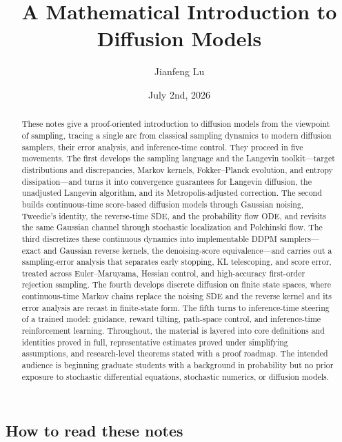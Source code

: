 \documentclass{amsart}
\title{A Mathematical Introduction to Diffusion Models}
\author{Jianfeng Lu}
\date{July 2nd, 2026}
\numberwithin{equation}{section}
\theoremstyle{plain}
\theoremstyle{definition}
\theoremstyle{remark}
\begin{document}
\begin{abstract}
These notes give a proof-oriented introduction to diffusion models from the
viewpoint of sampling, tracing a single arc from classical sampling dynamics to
modern diffusion samplers, their error analysis, and inference-time control.
They proceed in five movements.  The first develops the sampling language and
the Langevin toolkit---target distributions and discrepancies, Markov kernels,
Fokker--Planck evolution, and entropy dissipation---and turns it into
convergence guarantees for Langevin diffusion, the unadjusted Langevin
algorithm, and its Metropolis-adjusted correction.  The second builds
continuous-time score-based diffusion models through Gaussian noising, Tweedie's
identity, the reverse-time SDE, and the probability flow ODE, and revisits the
same Gaussian channel through stochastic localization and Polchinski flow.  The
third discretizes these continuous dynamics into implementable DDPM samplers---
exact and Gaussian reverse kernels, the denoising-score equivalence---and
carries out a sampling-error analysis that separates early stopping, KL
telescoping, and score error, treated across Euler--Maruyama, Hessian control,
and high-accuracy first-order rejection sampling.  The fourth develops discrete
diffusion on finite state spaces, where continuous-time Markov chains replace
the noising SDE and the reverse kernel and its error analysis are recast in
finite-state form.  The fifth turns to inference-time steering of a trained
model: guidance, reward tilting, path-space control, and inference-time
reinforcement learning.
Throughout, the material is layered into core definitions and identities proved
in full, representative estimates proved under simplifying assumptions, and
research-level theorems stated with a proof roadmap.  The intended audience is
beginning graduate students with a background in probability but no prior
exposure to stochastic differential equations, stochastic numerics, or diffusion models.
\end{abstract}

\maketitle

\setcounter{tocdepth}{1}
\tableofcontents

\subsection*{How to read these notes}
\end{document}
